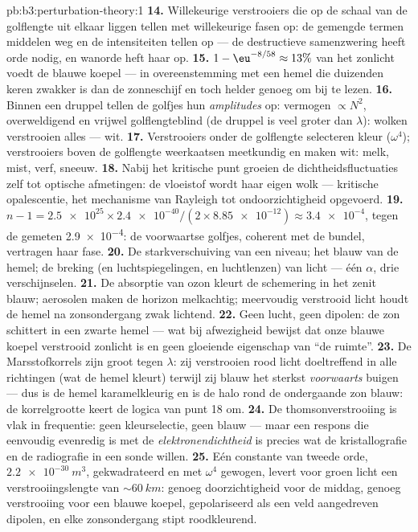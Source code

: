 \begin{solution}{pb:b3:perturbation-theory:1}
\textbf{14.} Willekeurige verstrooiers die op de schaal van de golflengte
uit elkaar liggen tellen met willekeurige fasen op: de gemengde termen
middelen weg en de intensiteiten tellen op --- de destructieve
samenzwering heeft orde nodig, en wanorde heft haar op.
\textbf{15.} $1 - \eu^{-8/58} \approx 13\%$ van het zonlicht voedt de
blauwe koepel --- in overeenstemming met een hemel die duizenden keren
zwakker is dan de zonneschijf en toch helder genoeg om bij te lezen.
\textbf{16.} Binnen een druppel tellen de golfjes hun \emph{amplitudes}
op: vermogen $\propto N^2$, overweldigend en vrijwel golflengteblind (de
druppel is veel groter dan $\lambda$): wolken verstrooien alles --- wit.
\textbf{17.} Verstrooiers onder de golflengte selecteren kleur
($\omega^4$); verstrooiers boven de golflengte weerkaatsen meetkundig en
maken wit: melk, mist, verf, sneeuw.
\textbf{18.} Nabij het kritische punt groeien de dichtheidsfluctuaties
zelf tot optische afmetingen: de vloeistof wordt haar eigen wolk ---
kritische opalescentie, het mechanisme van Rayleigh tot
ondoorzichtigheid opgevoerd.
\textbf{19.} $n - 1 = \num{2.5e25} \times \num{2.4e-40}/(2 \times
\num{8.85e-12}) \approx \num{3.4e-4}$, tegen de gemeten \num{2.9e-4}: de
voorwaartse golfjes, coherent met de bundel, vertragen haar fase.
\textbf{20.} De starkverschuiving van een niveau; het blauw van de hemel;
de breking (en luchtspiegelingen, en luchtlenzen) van licht --- één
$\alpha$, drie verschijnselen.
\textbf{21.} De absorptie van ozon kleurt de schemering in het zenit
blauw; aerosolen maken de horizon melkachtig; meervoudig verstrooid licht
houdt de hemel na zonsondergang zwak lichtend.
\textbf{22.} Geen lucht, geen dipolen: de zon schittert in een zwarte
hemel --- wat bij afwezigheid bewijst dat onze blauwe koepel verstrooid
zonlicht is en geen gloeiende eigenschap van ``de ruimte''.
\textbf{23.} De Marsstofkorrels zijn groot tegen $\lambda$: zij
verstrooien rood licht doeltreffend in alle richtingen (wat de hemel
kleurt) terwijl zij blauw het sterkst \emph{voorwaarts} buigen --- dus is
de hemel karamelkleurig en is de halo rond de ondergaande zon blauw: de
korrelgrootte keert de logica van punt 18 om.
\textbf{24.} De thomsonverstrooiing is vlak in frequentie: geen
kleurselectie, geen blauw --- maar een respons die eenvoudig evenredig is
met de \emph{elektronendichtheid} is precies wat de kristallografie en de
radiografie in een sonde willen.
\textbf{25.} Eén constante van tweede orde, $\qty{2.2e-30}{m^3}$,
gekwadrateerd en met $\omega^4$ gewogen, levert voor groen licht een
verstrooiingslengte van $\sim\qty{60}{km}$: genoeg doorzichtigheid voor de
middag, genoeg verstrooiing voor een blauwe koepel, gepolariseerd als een
veld aangedreven dipolen, en elke zonsondergang stipt roodkleurend.
\end{solution}
